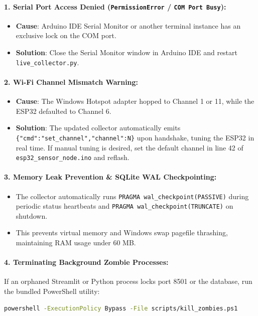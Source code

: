 \documentclass[11pt,a4paper]{article}
\begin{document}
\paragraph{1. Serial Port Access Denied (\texttt{PermissionError} / \texttt{COM Port Busy}):}
\begin{itemize}[noitemsep]
    \item \textbf{Cause}: Arduino IDE Serial Monitor or another terminal instance has an exclusive lock on the COM port.
    \item \textbf{Solution}: Close the Serial Monitor window in Arduino IDE and restart \texttt{live\_collector.py}.
\end{itemize}

\paragraph{2. Wi-Fi Channel Mismatch Warning:}
\begin{itemize}[noitemsep]
    \item \textbf{Cause}: The Windows Hotspot adapter hopped to Channel 1 or 11, while the ESP32 defaulted to Channel 6.
    \item \textbf{Solution}: The updated collector automatically emits \texttt{\{"cmd":"set\_channel","channel":N\}} upon handshake, tuning the ESP32 in real time. If manual tuning is desired, set the default channel in line 42 of \texttt{esp32\_sensor\_node.ino} and reflash.
\end{itemize}

\paragraph{3. Memory Leak Prevention \& SQLite WAL Checkpointing:}
\begin{itemize}[noitemsep]
    \item The collector automatically runs \texttt{PRAGMA wal\_checkpoint(PASSIVE)} during periodic status heartbeats and \texttt{PRAGMA wal\_checkpoint(TRUNCATE)} on shutdown.
    \item This prevents virtual memory and Windows swap pagefile thrashing, maintaining RAM usage under 60 MB.
\end{itemize}

\paragraph{4. Terminating Background Zombie Processes:}
If an orphaned Streamlit or Python process locks port 8501 or the database, run the bundled PowerShell utility:
\begin{lstlisting}[language=bash, numbers=none]
powershell -ExecutionPolicy Bypass -File scripts/kill_zombies.ps1
\end{lstlisting}
\end{document}
